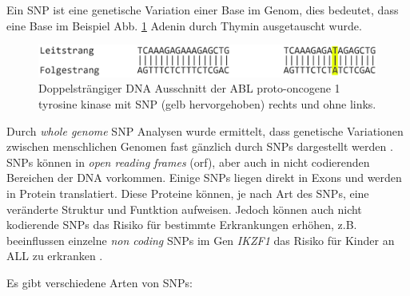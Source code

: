 Ein \ac{SNP} ist eine genetische Variation einer Base im Genom, dies bedeutet, dass eine Base im Beispiel Abb. \ref{fig:snp} Adenin durch Thymin ausgetauscht wurde.

\begin{figure}
\centering
\includegraphics[width=.95\textwidth]{images/DNA_ds_strand_with_snp.png}
\caption{Doppelsträngiger DNA Ausschnitt der ABL proto-oncogene 1 tyrosine kinase mit \ac{SNP} (gelb hervorgehoben) rechts und ohne links.}
\label{fig:snp}
\end{figure}



Durch \emph{whole genome} \ac{SNP} Analysen wurde ermittelt, dass genetische Variationen zwischen menschlichen Genomen fast gänzlich durch \ac{SNP}s dargestellt werden \cite{Do.2015}. 
\ac{SNP}s können in \emph{open reading frames} (orf), aber auch in nicht codierenden Bereichen der DNA vorkommen. Einige \ac{SNP}s liegen direkt in Exons und werden in Protein translatiert. Diese Proteine können, je nach Art des \ac{SNP}s, eine veränderte Struktur und Funtktion aufweisen. Jedoch können auch nicht kodierende \ac{SNP}s das Risiko für bestimmte Erkrankungen erhöhen, z.B. beeinflussen einzelne \emph{non coding} \ac{SNP}s im Gen \emph{IKZF1} das Risiko für Kinder an ALL zu erkranken \cite{Papaemmanuil.2009}.

Es gibt verschiedene Arten von \ac{SNP}s:

